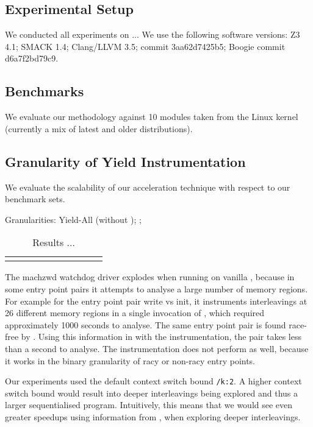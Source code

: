 \subsection{Experimental Setup}
\label{eval:setup}

We conducted all experiments on ... We use the following software versions: Z3 4.1; SMACK 1.4; Clang/LLVM 3.5; \corral commit 3aa62d7425b5; Boogie commit d6a7f2bd79c9.

\subsection{Benchmarks}
\label{eval:benchmarks}

We evaluate our methodology against 10 modules taken from the Linux kernel (currently a mix of latest and older distributions).

\subsection{Granularity of Yield Instrumentation}
\label{eval:granularity}

We evaluate the scalability of our acceleration technique with respect to our benchmark sets.

Granularities: Yield-All (\corral without \whoop); \yieldcoarse; \yieldmr

\newcommand{\colspacing}{\hspace{1.8em}}
\begin{table*}[t]
\small
\centering
\begin{tabular}{l rrr rr rr r r}
\centering

\end{tabular}
\caption{Results ...}
\label{tab:granularity}
\end{table*}

The machzwd watchdog driver explodes when running on vanilla \corral, because in some entry point pairs it attempts to analyse a large number of memory regions. For example for the entry point pair write vs init, it instruments interleavings at 26 different memory regions in a single invocation of \corral, which required approximately 1000 seconds to analyse. The same entry point pair is found race-free by \whoop. Using this information in \corral with the \yieldmr instrumentation, the pair takes less than a second to analyse. The \yieldcoarse instrumentation does not perform as well, because it works in the binary granularity of racy or non-racy entry points.

Our experiments used the default \corral context switch bound \texttt{/k:2}. A higher context switch bound would result into deeper interleavings being explored and thus a larger sequentialised program. Intuitively, this means that we would see even greater speedups using information from \whoop, when exploring deeper interleavings. 
